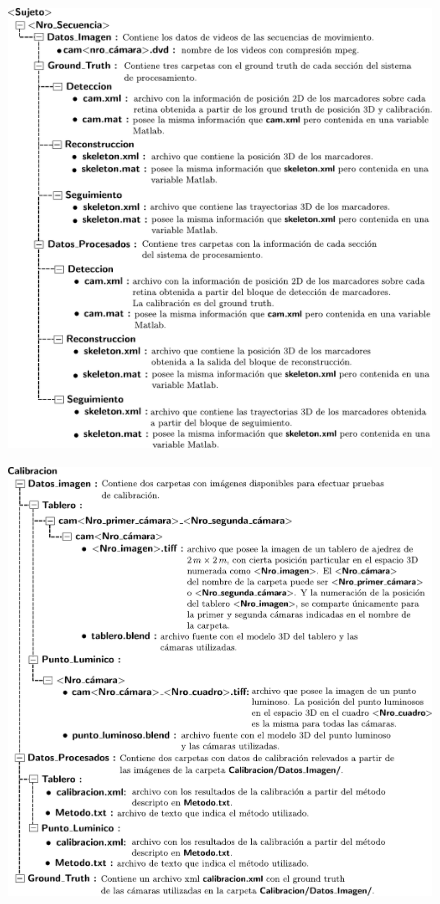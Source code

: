\begin{figure}[ht!]
\includegraphics[scale=0.695]{img/Base_Datos/Estructura_directorios.pdf}
\end{figure}
\begin{figure}[ht!]
\includegraphics[scale=0.695]{img/Base_Datos/Estructura_directorios2.pdf}
\end{figure}

